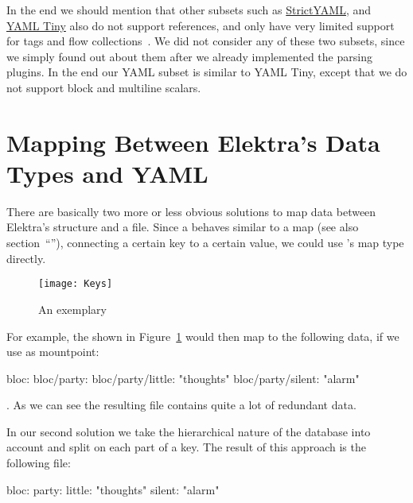 In the end we should mention that other  subsets such as \href{https://github.com/crdoconnor/strictyaml}{StrictYAML}, and \href{https://metacpan.org/pod/YAML::Tiny}{YAML Tiny} also do not support references, and only have very limited support for tags and flow collections~\cite{connor2018strictyaml, kennedy2018yamltiny}. We did not consider any of these two subsets, since we simply found out about them after we already implemented the parsing plugins. In the end our YAML subset is similar to YAML Tiny, except that we do not support block and multiline scalars.

\section{Mapping Between Elektra’s Data Types and YAML}
\label{sec:mapping_elektra_yaml}

\begin{sloppypar}
  There are basically two more or less obvious solutions to map data between Elektra’s  structure and a  file. Since a  behaves similar to a map (see also section~“”), connecting a certain key to a certain value, we could use ’s map type directly.
\end{sloppypar}

\begin{figure}
  \centering
    \texttt{[image: Keys]}
  \caption{An exemplary }
  \label{fig:keys}
\end{figure}

For example, the  shown in Figure~\ref{fig:keys} would then map to the following  data, if we use  as mountpoint:

\begin{yamlcode}
  bloc:
  bloc/party:
  bloc/party/little: "thoughts"
  bloc/party/silent: "alarm"
\end{yamlcode}

. As we can see the resulting  file contains quite a lot of redundant data.

In our second solution we take the hierarchical nature of the database into account and split on each part of a key. The result of this approach is the following  file:

\begin{yamlcode}
  bloc:
    party:
      little: "thoughts"
      silent: "alarm"
\end{yamlcode}

